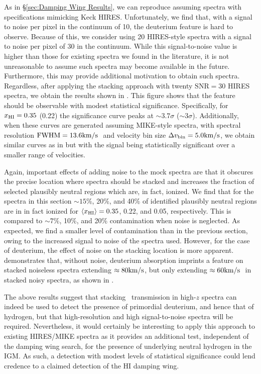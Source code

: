 As in \S\ref{sec:Damping Wing Results}, we can reproduce  assuming spectra with specifications mimicking Keck HIRES. Unfortunately, we find that, with a signal to noise per pixel in the continuum of 10, the deuterium feature is hard to observe. Because of this, we consider using 20 HIRES-style spectra with a signal to noise per pixel of 30 in the continuum. While this signal-to-noise value is higher than those for existing spectra we found in the literature, it is not unreasonable to assume such spectra may become available in the future. Furthermore, this may provide additional motivation to obtain such spectra. Regardless, after applying the stacking approach with twenty $\text{SNR} = 30$ HIRES spectra, we obtain the results shown in . This figure shows that the feature should be observable with modest statistical significance. Specifically, for $x_{\text{HI}} = 0.35$ (0.22) the significance curve peaks at $\sim 3.7\sigma$ ($\sim 3\sigma$). Additionally, when these curves are generated assuming MIKE-style spectra, with spectral resolution $\text{FWHM} = 13.6\text{km}/\text{s}\ $ and velocity bin size $\Delta v_{\text{bin}} = 5.0\text{km}/\text{s}$, we obtain similar curves as in  but with the signal being statistically significant over a smaller range of velocities. 


Again, important effects of adding noise to the mock spectra are that it obscures the precise location where spectra should be stacked and increases the fraction of selected plausibly neutral regions which are, in fact, ionized. We find that for the spectra in this section $\sim 15\%$, 20\%, and 40\% of identified plausibly neutral regions are in in fact ionized for $\langle x_{\text{HI}}\rangle = 0.35$, 0.22, and 0.05, respectively. This is compared to $\sim 7\%$, 10\%, and 20\% contamination when noise is neglected. As expected, we find a smaller level of contamination than in the previous section, owing to the increased signal to noise of the spectra used. However, for the case of deuterium, the effect of noise on the stacking location is more apparent.  demonstrates that, without noise, deuterium absorption imprints a feature on stacked noiseless spectra extending $\approx 80\text{km}/\text{s}$, but only extending $\approx 60\text{km}/\text{s}\ $ in stacked noisy spectra, as shown in .


The above results suggest that stacking \lyb\ transmission in high-$z$ spectra can indeed be used to detect the presence of primordial deuterium, and hence that of hydrogen, but that high-resolution and high signal-to-noise spectra will be required. Nevertheless, it would certainly be interesting to apply this approach to existing HIRES/MIKE spectra as it provides an additional test, independent of the damping wing search, for the presence of underlying neutral hydrogen in the IGM. As such, a detection with modest levels of statistical significance could lend credence to a claimed detection of the HI damping wing. 


